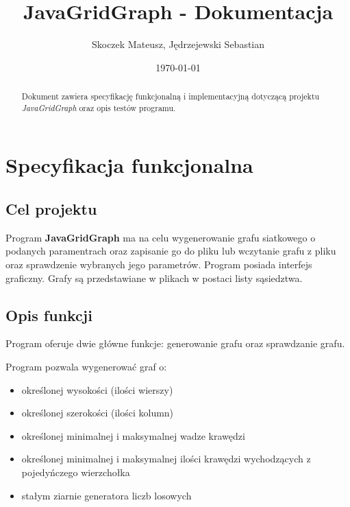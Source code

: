 \documentclass[11pt,a4paper]{report}
\title{\Huge JavaGridGraph - Dokumentacja}
\author{Skoczek Mateusz, Jędrzejewski Sebastian}
\date{\today}
\begin{document}
    \maketitle
        




    \begin{abstract}
        Dokument zawiera specyfikację funkcjonalną i implementacyjną dotyczącą projektu \textsl{JavaGridGraph} oraz opis testów programu.
    \end{abstract}





    \tableofcontents
    \thispagestyle{empty}





    \newpage
    \chapter{Specyfikacja funkcjonalna}




    \newpage
    \section{Cel projektu}

    Program \textbf{JavaGridGraph} ma na celu wygenerowanie grafu siatkowego o podanych paramentrach oraz zapisanie go do pliku lub wczytanie grafu z pliku oraz sprawdzenie wybranych jego parametrów. Program posiada interfejs graficzny. Grafy są przedstawiane w plikach w postaci listy sąsiedztwa.




    \newpage
    \section{Opis funkcji}

    Program oferuje dwie główne funkcje: generowanie grafu oraz sprawdzanie grafu.

    \vspace{4em}

    Program pozwala wygenerować graf o:
    
    \begin{itemize}
        \item określonej wysokości (ilości wierszy)
        \item określonej szerokości (ilości kolumn)
        \item określonej minimalnej i maksymalnej wadze krawędzi
        \item określonej minimalnej i maksymalnej ilości krawędzi wychodzących z pojedyńczego wierzchołka
        \item stałym ziarnie generatora liczb losowych
    \end{itemize}
\end{document}
